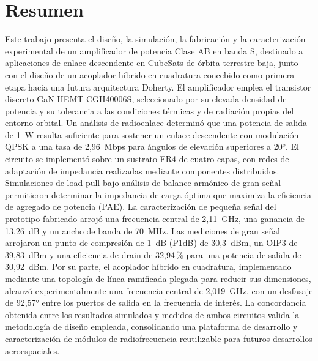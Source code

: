 \chapter*{Resumen}
Este trabajo presenta el diseño, la simulación, la fabricación y la caracterización experimental de un amplificador de potencia Clase AB en banda S, destinado a aplicaciones de enlace descendente en CubeSats de órbita terrestre baja, junto con el diseño de un acoplador híbrido en cuadratura concebido como primera etapa hacia una futura arquitectura Doherty. El amplificador emplea el transistor discreto GaN HEMT CGH40006S, seleccionado por su elevada densidad de potencia y su tolerancia a las condiciones térmicas y de radiación propias del entorno orbital. Un análisis de radioenlace determinó que una potencia de salida de 1~W resulta suficiente para sostener un enlace descendente con modulación QPSK a una tasa de 2,96~Mbps para ángulos de elevación superiores a 20°. El circuito se implementó sobre un sustrato FR4 de cuatro capas, con redes de adaptación de impedancia realizadas mediante componentes distribuidos. Simulaciones de load-pull bajo análisis de balance armónico de gran señal permitieron determinar la impedancia de carga óptima que maximiza la eficiencia de agregado de potencia (PAE). La caracterización de pequeña señal del prototipo fabricado arrojó una frecuencia central de 2,11~GHz, una ganancia de 13,26~dB y un ancho de banda de 70~MHz. Las mediciones de gran señal arrojaron un punto de compresión de 1~dB (P1dB) de 30,3~dBm, un OIP3 de 39,83~dBm y una eficiencia de drain de 32,94\,\% para una potencia de salida de 30,92~dBm. Por su parte, el acoplador híbrido en cuadratura, implementado mediante una topología de línea ramificada plegada para reducir sus dimensiones, alcanzó experimentalmente una frecuencia central de 2,019~GHz, con un desfasaje de 92,57° entre los puertos de salida en la frecuencia de interés. La concordancia obtenida entre los resultados simulados y medidos de ambos circuitos valida la metodología de diseño empleada, consolidando una plataforma de desarrollo y caracterización de módulos de radiofrecuencia reutilizable para futuros desarrollos aeroespaciales.


\MediaOptionLogicBlank